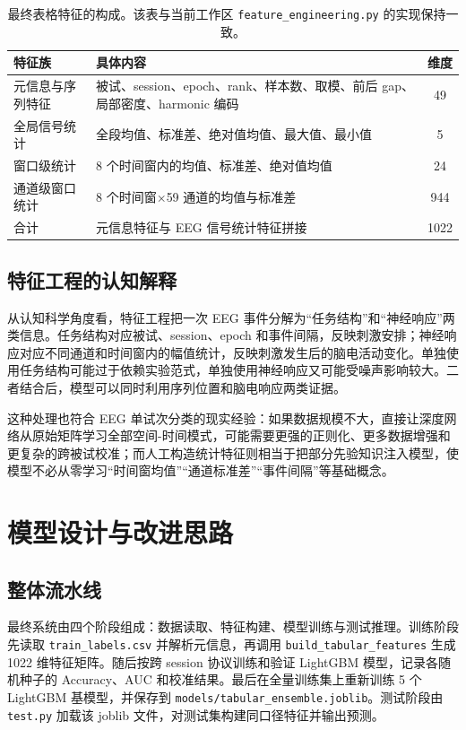 \begin{table}[htbp]
\centering
\small
\begin{tabular}{lp{8.5cm}c}
\hline
特征族 & 具体内容 & 维度 \\
\hline
元信息与序列特征 & 被试、session、epoch、rank、样本数、取模、前后 gap、局部密度、harmonic 编码 & 49 \\
全局信号统计 & 全段均值、标准差、绝对值均值、最大值、最小值 & 5 \\
窗口级统计 & 8 个时间窗内的均值、标准差、绝对值均值 & 24 \\
通道级窗口统计 & 8 个时间窗$\times$59 通道的均值与标准差 & 944 \\
\hline
合计 & 元信息特征与 EEG 信号统计特征拼接 & 1022 \\
\hline
\end{tabular}
\caption{最终表格特征的构成。该表与当前工作区 \texttt{feature\_engineering.py} 的实现保持一致。}
\end{table}

\section{特征工程的认知解释}

从认知科学角度看，特征工程把一次 EEG 事件分解为“任务结构”和“神经响应”两类信息。任务结构对应被试、session、epoch 和事件间隔，反映刺激安排；神经响应对应不同通道和时间窗内的幅值统计，反映刺激发生后的脑电活动变化。单独使用任务结构可能过于依赖实验范式，单独使用神经响应又可能受噪声影响较大。二者结合后，模型可以同时利用序列位置和脑电响应两类证据。

这种处理也符合 EEG 单试次分类的现实经验：如果数据规模不大，直接让深度网络从原始矩阵学习全部空间-时间模式，可能需要更强的正则化、更多数据增强和更复杂的跨被试校准；而人工构造统计特征则相当于把部分先验知识注入模型，使模型不必从零学习“时间窗均值”“通道标准差”“事件间隔”等基础概念。

\chapter{模型设计与改进思路}

\section{整体流水线}

最终系统由四个阶段组成：数据读取、特征构建、模型训练与测试推理。训练阶段先读取 \texttt{train\_labels.csv} 并解析元信息，再调用 \texttt{build\_tabular\_features} 生成 1022 维特征矩阵。随后按跨 session 协议训练和验证 LightGBM 模型，记录各随机种子的 Accuracy、AUC 和校准结果。最后在全量训练集上重新训练 5 个 LightGBM 基模型，并保存到 \texttt{models/tabular\_ensemble.joblib}。测试阶段由 \texttt{test.py} 加载该 joblib 文件，对测试集构建同口径特征并输出预测。

